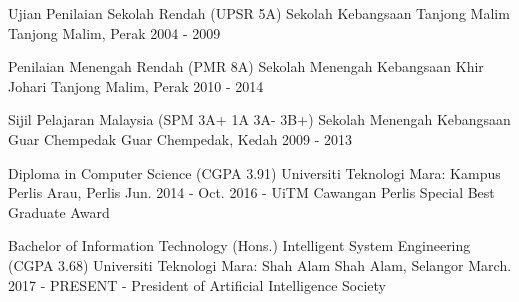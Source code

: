 

\begin{cventries}


\cventry
  {Ujian Penilaian Sekolah Rendah (UPSR 5A)}
  {Sekolah Kebangsaan Tanjong Malim}
  {Tanjong Malim, Perak}
  {2004 - 2009}
  {}

\cventry
  {Penilaian Menengah Rendah (PMR 8A)}
  {Sekolah Menengah Kebangsaan Khir Johari}
  {Tanjong Malim, Perak}
  {2010 - 2014}
  {}
  
 \cventry
  {Sijil Pelajaran Malaysia (SPM 3A+ 1A 3A- 3B+)}
  {Sekolah Menengah Kebangsaan Guar Chempedak}
  {Guar Chempedak, Kedah}
  {2009 - 2013}
  {}

\cventry
  {Diploma in Computer Science (CGPA 3.91)}
  {Universiti Teknologi Mara: Kampus Perlis}
  {Arau, Perlis}
  {Jun. 2014 - Oct. 2016}
  {- UiTM Cawangan Perlis Special Best Graduate Award}

  \cventry
  {Bachelor of Information Technology (Hons.) Intelligent System Engineering (CGPA 3.68)}
  {Universiti Teknologi Mara: Shah Alam}
  {Shah Alam, Selangor}
  {March. 2017 - PRESENT}
  {- President of Artificial Intelligence Society}

\end{cventries}
